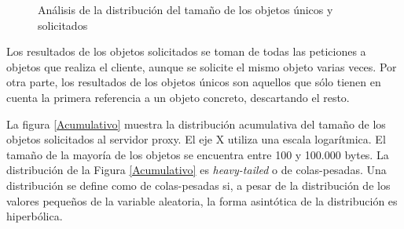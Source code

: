 \documentclass[twocolumn]{Jornadas}
\begin{document}
\begin{figure}[ht!]
\caption{Análisis de la distribución del tamaño de los objetos únicos y solicitados}
\label{fig:tamObjetos}
\end{figure}

Los resultados de los objetos solicitados se toman de todas las peticiones a objetos que realiza el cliente, aunque se solicite el mismo objeto varias veces. Por otra parte, los resultados de los objetos únicos son aquellos que sólo tienen en cuenta la primera referencia a un objeto concreto, descartando el resto.

La figura \ref{Acumulativo} muestra la distribución acumulativa del tamaño de los objetos solicitados al servidor proxy. El eje X utiliza una escala logarítmica. El tamaño de la mayoría de los objetos se encuentra entre 100 y 100.000 bytes. La distribución de la Figura \ref{Acumulativo} es \emph{heavy-tailed} o de colas-pesadas. Una distribución se define como de colas-pesadas si, a pesar de la distribución de los valores pequeños de la variable aleatoria, la forma asintótica de la distribución es hiperbólica. %
\end{document}
